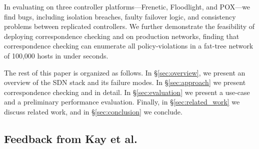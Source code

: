 In evaluating \projectname{} on
three controller platforms---Frenetic, Floodlight, and POX---we find  bugs,
including isolation breaches,
faulty failover logic, and consistency problems between replicated
controllers. We further demonstrate the feasibility of deploying
correspondence checking and \simulator{} on production networks,
finding that correspondence checking can enumerate all policy-violations in a
fat-tree network of 100,000 hosts in under  seconds.

The rest of this paper is organized as follows. In \S\ref{sec:overview},
we present an overview of the SDN stack and its failure modes.
In \S\ref{sec:approach} we present correspondence checking and
\simulator{} in detail. In \S\ref{sec:evaluation} we present
a use-case and a preliminary performance evaluation.
Finally, in \S\ref{sec:related_work} we discuss related work,
and in \S\ref{sec:conclusion} we conclude.

\subsection{Feedback from Kay et al.}


